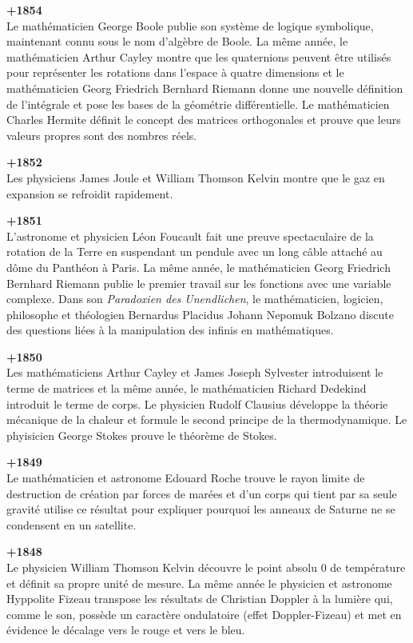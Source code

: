 \textbf{+1854}\\
Le mathématicien George Boole publie son système de logique symbolique, maintenant connu sous le nom d'algèbre de Boole. La même année, le mathématicien Arthur Cayley montre que les quaternions peuvent être utilisés pour représenter les rotations dans l'espace à quatre dimensions et le mathématicien Georg Friedrich Bernhard Riemann donne une nouvelle définition de l'intégrale et pose les bases de la géométrie différentielle. Le mathématicien Charles Hermite définit le concept des matrices orthogonales et prouve que leurs valeurs propres sont des nombres réels.

\textbf{+1852}\\
Les physiciens James Joule et William Thomson Kelvin montre que le gaz en expansion se refroidit rapidement.

\textbf{+1851}\\
L'astronome et physicien Léon Foucault fait une preuve spectaculaire de la rotation de la Terre en suspendant un pendule avec un long câble attaché au dôme du Panthéon à Paris. La même année, le mathématicien Georg Friedrich Bernhard Riemann publie le premier travail sur les fonctions avec une variable complexe. Dans son \textit{Paradoxien des Unendlichen}, le mathématicien, logicien, philosophe et théologien Bernardus Placidus Johann Nepomuk Bolzano discute des questions liées à la manipulation des infinis en mathématiques.

\textbf{+1850}\\
Les mathématiciens Arthur Cayley et James Joseph Sylvester introduisent le terme de matrices et la même année, le mathématicien Richard Dedekind introduit le terme de corps. Le physicien Rudolf Clausius développe la théorie mécanique de la chaleur et formule le second principe de la thermodynamique. Le phyisicien George Stokes prouve le théorème de Stokes.

\textbf{+1849}\\
Le mathématicien et astronome Edouard Roche trouve le rayon limite de destruction de création par forces de marées et d'un corps qui tient par sa seule gravité utilise ce résultat pour expliquer pourquoi les anneaux de Saturne ne se condensent en un satellite.

\textbf{+1848}\\
Le physicien William Thomson Kelvin découvre le point absolu $0$ de température et définit sa propre unité de mesure. La même année le physicien et astronome Hyppolite Fizeau transpose les résultats de Christian Doppler à la lumière qui, comme le son, possède un caractère ondulatoire (effet Doppler-Fizeau) et met en évidence le décalage vers le rouge et vers le bleu.

